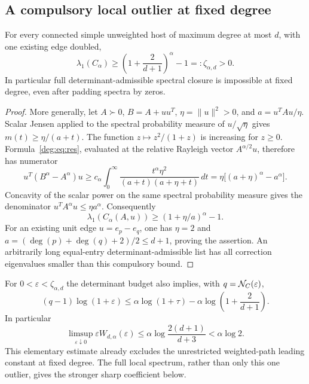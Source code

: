 \subsection{A compulsory local outlier at fixed degree}
\begin{theorem}\label{deg:thm:outlier}
For every connected simple unweighted host of maximum degree at most
$d$, with one existing edge doubled,
\[
 \lambda_1(C_\alpha)\ge
             \left(1+\frac{2}{d+1}\right)^\alpha-1=:\zeta_{\alpha,d}>0.
\]
In particular full determinant-admissible spectral closure is impossible
at fixed degree, even after padding spectra by zeros.
\end{theorem}
\begin{proof}
More generally, let $A\succ0$, $B=A+uu^T$, $\eta=\|u\|^2>0$,
and $a=u^TAu/\eta$. Scalar Jensen applied to the spectral probability
measure of $u/\sqrt\eta$ gives $m(t)\ge\eta/(a+t)$.
The function $z\mapsto z^2/(1+z)$ is increasing for $z\ge0$.
Formula~\eqref{deg:eq:res}, evaluated at the relative Rayleigh vector
$A^{\alpha/2}u$, therefore has numerator
\[
 u^T(B^\alpha-A^\alpha)u
 \ge c_\alpha\int_0^\infty
          \frac{t^\alpha\eta^2}{(a+t)(a+\eta+t)}\,dt
 =\eta\bigl[(a+\eta)^\alpha-a^\alpha\bigr].
\]
Concavity of the scalar power on the same spectral probability measure
gives the denominator $u^TA^\alpha u\le\eta a^\alpha$. Consequently
\[
 \lambda_1(C_\alpha(A,u))\ge(1+\eta/a)^\alpha-1.
\]
For an existing unit edge $u=e_p-e_q$, one has $\eta=2$ and
$a=(\deg(p)+\deg(q)+2)/2\le d+1$, proving the assertion.
An arbitrarily long equal-entry determinant-admissible list has all
correction eigenvalues smaller than this compulsory bound.
\end{proof}

For $0<\varepsilon<\zeta_{\alpha,d}$ the determinant budget also implies,
with $q=\mathcal N_C(\varepsilon)$,
\[
 (q-1)\log(1+\varepsilon)
 \le\alpha\log(1+\tau)-\alpha\log\left(1+\frac2{d+1}\right).
\]
In particular
\[
 \limsup_{\varepsilon\downarrow0}\varepsilon W_{d,\alpha}(\varepsilon)
       \le\alpha\log\frac{2(d+1)}{d+3}<\alpha\log2.
\]
This elementary estimate already excludes the unrestricted weighted-path
leading constant at fixed degree. The full local spectrum, rather than
only this one outlier, gives the stronger sharp coefficient below.




